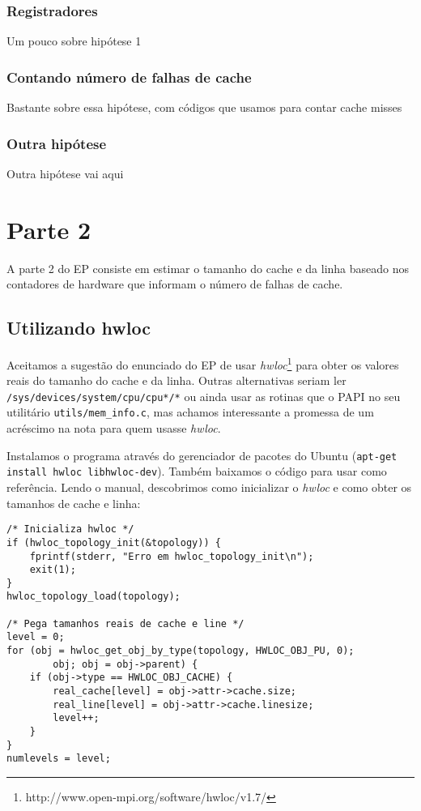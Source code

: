\documentclass[a4paper,oneside,12pt]{article}
\begin{document}
\subsubsection{Registradores}

Um pouco sobre hipótese 1 %


\subsubsection{Contando número de falhas de cache}

Bastante sobre essa hipótese, com códigos que usamos para contar cache misses %

\subsubsection{Outra hipótese}

Outra hipótese vai aqui %

\section{Parte 2}

A parte 2 do EP consiste em estimar o tamanho do cache e da linha baseado nos contadores de hardware que informam o número de falhas de cache.

\subsection{Utilizando hwloc}

Aceitamos a sugestão do enunciado do EP de usar \emph{hwloc}\footnote{http://www.open-mpi.org/software/hwloc/v1.7/} para obter os valores reais do tamanho do cache e da linha. Outras alternativas seriam ler {\tt /sys/devices/system/cpu/cpu*/*} ou ainda usar as rotinas que o PAPI no seu utilitário {\tt utils/mem\_info.c}, mas achamos interessante a promessa de um acréscimo na nota para quem usasse \emph{hwloc}.

Instalamos o programa através do gerenciador de pacotes do Ubuntu ({\tt apt-get install hwloc libhwloc-dev}). Também baixamos o código para usar como referência. Lendo o manual, descobrimos como inicializar o \emph{hwloc} e como obter os tamanhos de cache e linha:

\begin{verbatim}
/* Inicializa hwloc */
if (hwloc_topology_init(&topology)) {
    fprintf(stderr, "Erro em hwloc_topology_init\n");
    exit(1);
}
hwloc_topology_load(topology);

/* Pega tamanhos reais de cache e line */
level = 0;
for (obj = hwloc_get_obj_by_type(topology, HWLOC_OBJ_PU, 0);
        obj; obj = obj->parent) {
    if (obj->type == HWLOC_OBJ_CACHE) {
        real_cache[level] = obj->attr->cache.size;
        real_line[level] = obj->attr->cache.linesize;
        level++;
    }
}
numlevels = level;
\end{verbatim}
\end{document}
